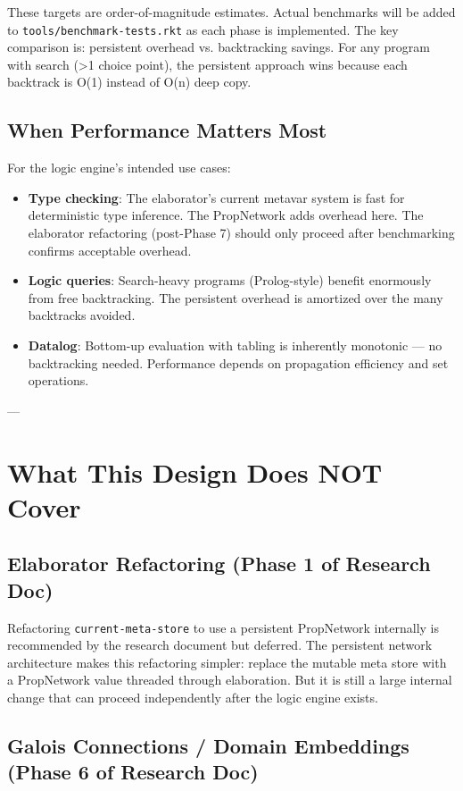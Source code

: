 \documentclass[11pt]{article}
\begin{document}
These targets are order-of-magnitude estimates. Actual benchmarks will be
added to \texttt{tools/benchmark-tests.rkt} as each phase is implemented. The
key comparison is: persistent overhead vs. backtracking savings. For any
program with search (>1 choice point), the persistent approach wins
because each backtrack is O(1) instead of O(n) deep copy.
\subsection{When Performance Matters Most}
\label{sec:orge3dfd15}

For the logic engine's intended use cases:
\begin{itemize}
\item \textbf{Type checking}: The elaborator's current metavar system is fast for
deterministic type inference. The PropNetwork adds overhead here. The
elaborator refactoring (post-Phase 7) should only proceed after
benchmarking confirms acceptable overhead.
\item \textbf{Logic queries}: Search-heavy programs (Prolog-style) benefit enormously
from free backtracking. The persistent overhead is amortized over the
many backtracks avoided.
\item \textbf{Datalog}: Bottom-up evaluation with tabling is inherently monotonic —
no backtracking needed. Performance depends on propagation efficiency
and set operations.
\end{itemize}

---
\section{What This Design Does NOT Cover}
\label{sec:org8a64086}

\subsection{Elaborator Refactoring (Phase 1 of Research Doc)}
\label{sec:orgd75fe31}

Refactoring \texttt{current-meta-store} to use a persistent PropNetwork internally
is recommended by the research document but deferred. The persistent network
architecture makes this refactoring simpler: replace the mutable meta store
with a PropNetwork value threaded through elaboration. But it is still a
large internal change that can proceed independently after the logic engine
exists.
\subsection{Galois Connections / Domain Embeddings (Phase 6 of Research Doc)}
\label{sec:orgf817011}
\end{document}
